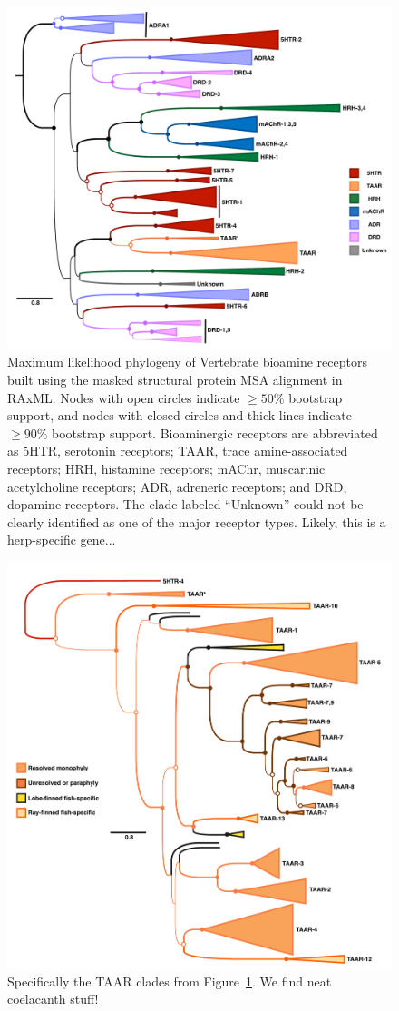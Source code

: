 \documentclass[fleqn,10pt]{wlpeerj}
\begin{document}
\begin{figure}[htbp]
	\centerline{\includegraphics[width=18cm]{figures/masked_part_phylogeny.pdf}}
	\caption{\label{phylogeny} Maximum likelihood phylogeny of Vertebrate bioamine receptors built using the masked structural protein MSA alignment in RAxML. Nodes with open circles indicate $\geq 50\%$ bootstrap support, and nodes with closed circles and thick lines indicate $\geq 90\%$ bootstrap support. Bioaminergic receptors are abbreviated as 5HTR, serotonin receptors; TAAR, trace amine-associated receptors; HRH, histamine receptors; mAChr, muscarinic acetylcholine receptors; ADR, adreneric receptors; and DRD, dopamine receptors. The clade labeled ``Unknown'' could not be clearly identified as one of the major receptor types. Likely, this is a herp-specific gene...}
\end{figure}


\newpage

\begin{figure}[htbp]
	\centerline{\includegraphics[width=15cm]{figures/taar_phylogeny.pdf}}
	\caption{\label{taar_tree} Specifically the TAAR clades from Figure~\ref{phylogeny}. We find neat coelacanth stuff!}
\end{figure}
\end{document}
